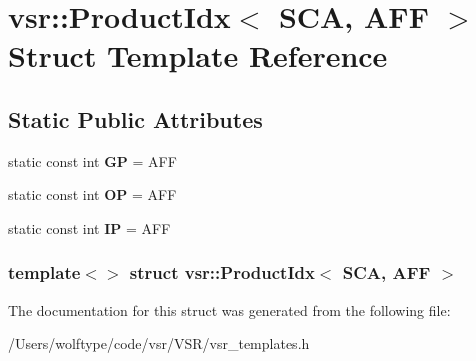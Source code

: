 \hypertarget{structvsr_1_1_product_idx_3_01_s_c_a_00_01_a_f_f_01_4}{\section{vsr\-:\-:Product\-Idx$<$ S\-C\-A, A\-F\-F $>$ Struct Template Reference}
\label{structvsr_1_1_product_idx_3_01_s_c_a_00_01_a_f_f_01_4}
}
\subsection*{Static Public Attributes}
\begin{DoxyCompactItemize}
\item 
\hypertarget{structvsr_1_1_product_idx_3_01_s_c_a_00_01_a_f_f_01_4_a3992644b7a5e5d7ee19d277e92eb4e92}{static const int {\bfseries G\-P} = A\-F\-F}\label{structvsr_1_1_product_idx_3_01_s_c_a_00_01_a_f_f_01_4_a3992644b7a5e5d7ee19d277e92eb4e92}

\item 
\hypertarget{structvsr_1_1_product_idx_3_01_s_c_a_00_01_a_f_f_01_4_a2ac1f5f553761108ad0ede0f031346a1}{static const int {\bfseries O\-P} = A\-F\-F}\label{structvsr_1_1_product_idx_3_01_s_c_a_00_01_a_f_f_01_4_a2ac1f5f553761108ad0ede0f031346a1}

\item 
\hypertarget{structvsr_1_1_product_idx_3_01_s_c_a_00_01_a_f_f_01_4_a6e80d8ec8a9f2b01af57b9e92ef76c3d}{static const int {\bfseries I\-P} = A\-F\-F}\label{structvsr_1_1_product_idx_3_01_s_c_a_00_01_a_f_f_01_4_a6e80d8ec8a9f2b01af57b9e92ef76c3d}

\end{DoxyCompactItemize}
\subsubsection*{template$<$$>$ struct vsr\-::\-Product\-Idx$<$ S\-C\-A, A\-F\-F $>$}



The documentation for this struct was generated from the following file\-:\begin{DoxyCompactItemize}
\item 
/\-Users/wolftype/code/vsr/\-V\-S\-R/vsr\-\_\-templates.\-h\end{DoxyCompactItemize}
